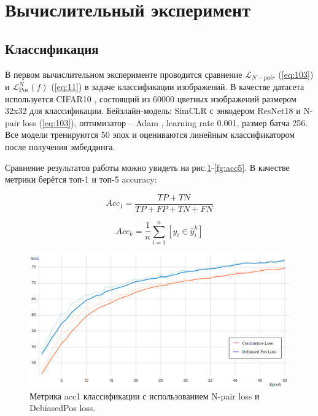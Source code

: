 \documentclass[a4paper, 14pt]{article}
\begin{document}
\newpage
\section{Вычислительный эксперимент}

\subsection{Классификация}
В первом вычислительном эксперименте проводится сравнение $\mathcal{L}_{N-pair}$ (\ref{eq:103}) и $\mathcal{L}_{\text{Pos}}^N(f)$ (\ref{eq:11}) в задаче классификации изображений. В качестве датасета используется CIFAR10 \citep{krizhevsky2009learning}, состоящий из 60000 цветных изображений размером 32x32 для классификации. Бейзлайн-модель: SimCLR \citep{chuang2020debiased} с энкодером ResNet18 \citep{he2015deep} и N-pair loss (\ref{eq:103}), оптимизатор -- Adam \citep{kingma2017adam}, learning rate 0.001, размер батча 256. Все модели тренируются 50 эпох и оцениваются линейным классификатором после получения эмбеддинга.

Сравнение результатов работы можно увидеть на рис.\ref{fg:acc1}-\ref{fg:acc5}. В качестве метрики берётся топ-1 и топ-5 accuracy:

\[Acc_1 = \frac{TP + TN}{TP + FP + TN + FN}\]

\[Acc_k = \frac{1}{n}\sum\limits_{i=1}^n[y_i \in \hat{y}_i^k]\]

\begin{figure}[!ht]
    \includegraphics[scale = 0.45]{Pictures/loss_acc1.png}
    \caption{Метрика acc1 классификации с использованием N-pair loss и DebiasedPos loss.}
    \label{fg:acc1}
\end{figure}
\end{document}
